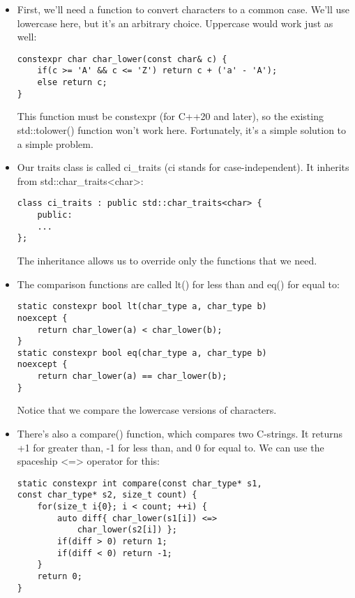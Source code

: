\begin{itemize}
\item 
First, we'll need a function to convert characters to a common case. We'll use lowercase here, but it's an arbitrary choice. Uppercase would work just as well:

\begin{lstlisting}[style=styleCXX]
constexpr char char_lower(const char& c) {
	if(c >= 'A' && c <= 'Z') return c + ('a' - 'A');
	else return c;
}
\end{lstlisting}

This function must be constexpr (for C++20 and later), so the existing std::tolower() function won't work here. Fortunately, it's a simple solution to a simple problem.

\item 
Our traits class is called ci\_traits (ci stands for case-independent). It inherits from std::char\_traits<char>:

\begin{lstlisting}[style=styleCXX]
class ci_traits : public std::char_traits<char> {
	public:
	...
};
\end{lstlisting}

The inheritance allows us to override only the functions that we need.

\item 
The comparison functions are called lt() for less than and eq() for equal to:

\begin{lstlisting}[style=styleCXX]
static constexpr bool lt(char_type a, char_type b)
noexcept {
	return char_lower(a) < char_lower(b);
}
static constexpr bool eq(char_type a, char_type b)
noexcept {
	return char_lower(a) == char_lower(b);
}
\end{lstlisting}

Notice that we compare the lowercase versions of characters.

\item 
There's also a compare() function, which compares two C-strings. It returns +1 for greater than, -1 for less than, and 0 for equal to. We can use the spaceship <=> operator for this:

\begin{lstlisting}[style=styleCXX]
static constexpr int compare(const char_type* s1,
const char_type* s2, size_t count) {
	for(size_t i{0}; i < count; ++i) {
		auto diff{ char_lower(s1[i]) <=>
			char_lower(s2[i]) };
		if(diff > 0) return 1;
		if(diff < 0) return -1;
	}
	return 0;
}
\end{lstlisting}


\end{itemize}
